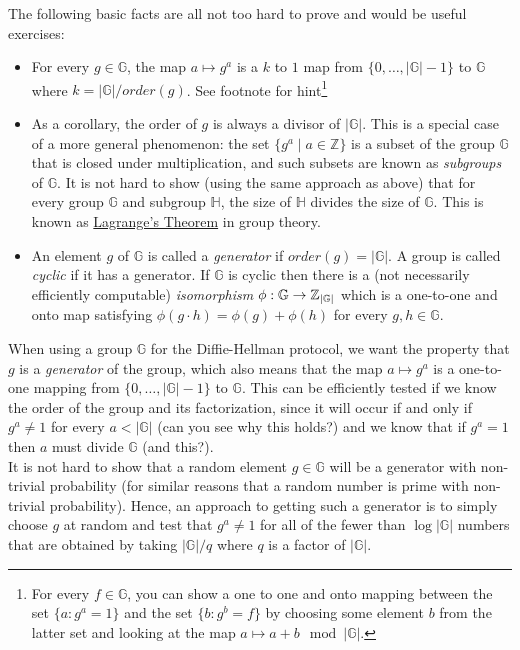 The following basic facts are all not too hard to prove and would be
useful exercises:

\begin{itemize}
\item
  For every \(g\in \mathbb{G}\), the map \(a \mapsto g^a\) is a \(k\) to
  \(1\) map from \(\{0,\ldots,|\mathbb{G}|-1\}\) to \(\mathbb{G}\) where
  \(k=|\mathbb{G}|/order(g)\). See footnote for hint\footnote{For every
    \(f\in \mathbb{G}\), you can show a one to one and onto mapping
    between the set \(\{ a : g^a = 1 \}\) and the set
    \(\{b : g^b= f \}\) by choosing some element \(b\) from the latter
    set and looking at the map \(a \mapsto a+b \mod |\mathbb{G}|\).}
\item
  As a corollary, the order of \(g\) is always a divisor of
  \(|\mathbb{G}|\). This is a special case of a more general phenomenon:
  the set \(\{ g^a \;|\; a\in\mathbb{Z} \}\) is a subset of the group
  \(\mathbb{G}\) that is closed under multiplication, and such subsets
  are known as \emph{subgroups} of \(\mathbb{G}\). It is not hard to
  show (using the same approach as above) that for every group
  \(\mathbb{G}\) and subgroup \(\mathbb{H}\), the size of \(\mathbb{H}\)
  divides the size of \(\mathbb{G}\). This is known as
  \href{https://goo.gl/Q9VSqn}{Lagrange's Theorem} in group theory.
\item
  An element \(g\) of \(\mathbb{G}\) is called a \emph{generator} if
  \(order(g)=|\mathbb{G}|\). A group is called \emph{cyclic} if it has a
  generator. If \(\mathbb{G}\) is cyclic then there is a (not
  necessarily efficiently computable) \emph{isomorphism}
  \(\phi:\mathbb{G}\rightarrow{\mathbb{Z}}_{|\mathbb{G}|}\) which is a one-to-one
  and onto map satisfying \(\phi(g\cdot h)=\phi(g)+\phi(h)\) for every
  \(g,h\in\mathbb{G}\).
\end{itemize}

When using a group \(\mathbb{G}\) for the Diffie-Hellman protocol, we
want the property that \(g\) is a \emph{generator} of the group, which
also means that the map \(a \mapsto g^a\) is a one-to-one mapping from
\(\{0,\ldots,|\mathbb{G}|-1\}\) to \(\mathbb{G}\). This can be
efficiently tested if we know the order of the group and its
factorization, since it will occur if and only if \(g^a \neq 1\) for
every \(a<|\mathbb{G}|\) (can you see why this holds?) and we know that
if \(g^a=1\) then \(a\) must divide \(\mathbb{G}\) (and this?).\\
It is not hard to show that a random element \(g\in \mathbb{G}\) will be
a generator with non-trivial probability (for similar reasons that a
random number is prime with non-trivial probability). Hence, an approach
to getting such a generator is to simply choose \(g\) at random and test
that \(g^a \neq 1\) for all of the fewer than \(\log |\mathbb{G}|\)
numbers that are obtained by taking \(|\mathbb{G}|/q\) where \(q\) is a
factor of \(|\mathbb{G}|\).


